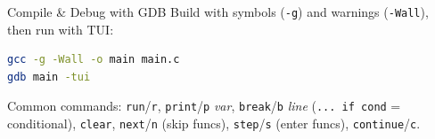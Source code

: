 \multend

\begin{KR}{Compile \& Debug with GDB}
    Build with symbols (\texttt{-g}) and warnings (\texttt{-Wall}), then run with TUI:
\begin{lstlisting}[language=bash, style=basesmol, aboveskip=2pt, belowskip=2pt]
gcc -g -Wall -o main main.c
gdb main -tui
\end{lstlisting}
    Common commands: \texttt{run}/\texttt{r}, \texttt{print}/\texttt{p} \emph{var},
    \texttt{break}/\texttt{b} \emph{line} (\texttt{... if cond} = conditional),
    \texttt{clear}, \texttt{next}/\texttt{n} (skip funcs), \texttt{step}/\texttt{s}
    (enter funcs), \texttt{continue}/\texttt{c}.
\end{KR}


\raggedcolumns
